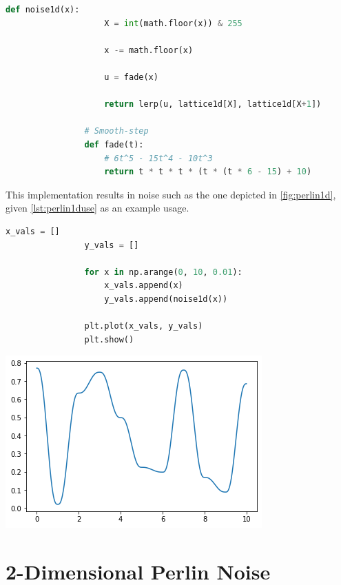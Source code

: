 \documentclass[10pt]{report}
\begin{document}
			\begin{lstlisting}[label={lst:perlin1d}, language=Python, frame=none, caption={1D Perlin Noise.}, captionpos=b]	
				def noise1d(x):
					X = int(math.floor(x)) & 255
					
					x -= math.floor(x)
					
					u = fade(x)
					
					return lerp(u, lattice1d[X], lattice1d[X+1])
				
				# Smooth-step
				def fade(t):
					# 6t^5 - 15t^4 - 10t^3
					return t * t * t * (t * (t * 6 - 15) + 10)
			\end{lstlisting}
		
			This implementation results in noise such as the one depicted in \autoref{fig:perlin1d}, given \autoref{lst:perlin1duse} as an example usage.
			
			\begin{lstlisting}[label={lst:perlin1duse}, language=Python, frame=none, caption={One dimensional example.}, captionpos=b]
				x_vals = []
				y_vals = []
				
				for x in np.arange(0, 10, 0.01):
					x_vals.append(x)
					y_vals.append(noise1d(x))
				
				plt.plot(x_vals, y_vals)
				plt.show()
			\end{lstlisting}
			
			\begin{minipage}{\textwidth}
				\centering
				\includegraphics[scale=.5]{smoothnoise}
				\label{fig:perlin1d}
			\end{minipage} 
	
		\section{2-Dimensional Perlin Noise}
		
\end{document}
